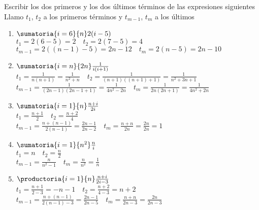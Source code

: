 \ejercicio

Escribir los dos primeros y los dos últimos términos de las expresiones siguientes\\

Llamo $t_1$, $t_2$ a los primeros términos y $t_{m-1}$, $t_m$ a los últimos\\

\begin{enumerate}[label=\roman*)]
    \item $\sumatoria{i=6}{n}2(i - 5)$\\

    $t_1 = 2(6 - 5) = 2 \quad t_2 = 2(7 - 5) = 4$\\

    $t_{m-1} = 2((n - 1) - 5) = 2n - 12 \quad t_m = 2(n - 5) = 2n - 10$\\

    \item $\sumatoria{i=n}{2n} \frac{1}{i(i+1)}$\\

    $t_1 = \frac{1}{n(n + 1)} = \frac{1}{n^2 + n} \quad t_2 = \frac{1}{(n+1)((n+1) + 1)} = \frac{1}{n^2 + 3n + 1}$\\

    $t_{m-1} = \frac{1}{(2n-1)(2n-1+1)} = \frac{1}{4n^2-2n} \quad t_m = \frac{1}{2n(2n+1)} = \frac{1}{4n^2 + 2n}$\\

    \item $\sumatoria{i=1}{n} \frac{n + i}{2i}$\\

    $t_1 = \frac{n + 1}{2} \quad t_2 = \frac{n + 2}{4}$\\

    $t_{m-1} = \frac{n + (n-1)}{2(n-1)} = \frac{2n - 1}{2n - 2} \quad t_m = \frac{n + n}{2n} = \frac{2n}{2n} = 1$\\

    \item $\sumatoria{i=1}{n^2} \frac{n}{i}$\\

    $t_1 = n \quad t_2 = \frac{n}{2}$\\
    
    $t_{m-1} = \frac{n}{n^2 - 1} \quad t_m = \frac{n}{n^2} = \frac{1}{n}$\\

    \item $\productoria{i=1}{n} \frac{n + i}{2i - 3}$\\

    $t_1 = \frac{n + 1}{2 - 3} = - n - 1 \quad t_2 = \frac{n + 2}{4 - 3} = n + 2$\\
    
    $t_{m-1} = \frac{n + (n-1)}{2(n-1) - 3} = \frac{2n - 1}{2n - 5} \quad t_m = \frac{n + n}{2n - 3} = \frac{2n}{2n - 3}$\\
\end{enumerate}